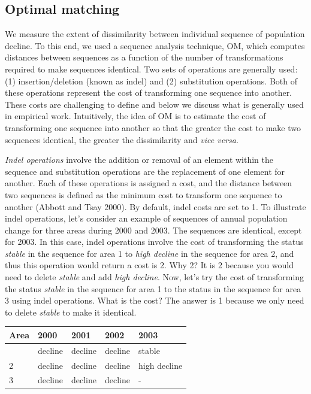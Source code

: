 \documentclass[
  letterpaper,
  DIV=11,
  numbers=noendperiod]{scrreprt}
\begin{document}
\hypertarget{optimal-matching}{%
\subsection{Optimal matching}\label{optimal-matching}}

We measure the extent of dissimilarity between individual sequence of
population decline. To this end, we used a sequence analysis technique,
OM, which computes distances between sequences as a function of the
number of transformations required to make sequences identical. Two sets
of operations are generally used: (1) insertion/deletion (known as
indel) and (2) substitution operations. Both of these operations
represent the cost of transforming one sequence into another. These
costs are challenging to define and below we discuss what is generally
used in empirical work. Intuitively, the idea of OM is to estimate the
cost of transforming one sequence into another so that the greater the
cost to make two sequences identical, the greater the dissimilarity and
\emph{vice versa}.

\emph{Indel operations} involve the addition or removal of an element
within the sequence and substitution operations are the replacement of
one element for another. Each of these operations is assigned a cost,
and the distance between two sequences is defined as the minimum cost to
transform one sequence to another (Abbott and Tsay 2000). By default,
indel costs are set to 1. To illustrate indel operations, let's consider
an example of sequences of annual population change for three areas
during 2000 and 2003. The sequences are identical, except for 2003. In
this case, indel operations involve the cost of transforming the status
\emph{stable} in the sequence for area 1 to \emph{high decline} in the
sequence for area 2, and thus this operation would return a cost is 2.
Why 2? It is 2 because you would need to delete \emph{stable} and add
\emph{high decline}. Now, let's try the cost of transforming the status
\emph{stable} in the sequence for area 1 to the status in the sequence
for area 3 using indel operations. What is the cost? The answer is 1
because we only need to delete \emph{stable} to make it identical.

\begin{longtable}[]{@{}lllll@{}}
\toprule\noalign{}
Area & 2000 & 2001 & 2002 & 2003 \\
\midrule\noalign{}
\endhead
\bottomrule\noalign{}
\endlastfoot
1 & decline & decline & decline & stable \\
2 & decline & decline & decline & high decline \\
3 & decline & decline & decline & - \\
\end{longtable}
\end{document}
